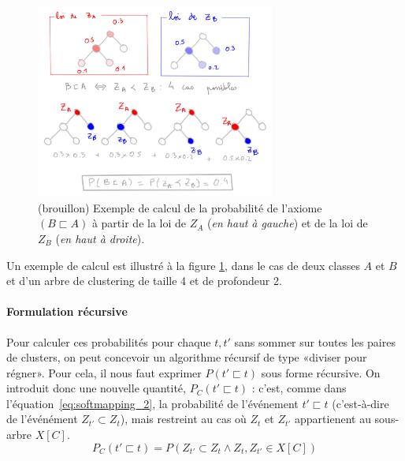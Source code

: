 \begin{figure}[h]
    \centering
    \includegraphics[width=0.7\textwidth]{img/softmapping.jpg}
    \caption[Principe de la méthode Soft Mapping]{(brouillon) Exemple de calcul de la probabilité de l'axiome $(B \sqsubset A)$ à partir de la loi de $Z_A$ (\textit{en haut à gauche}) et de la loi de $Z_B$ (\textit{en haut à droite}).}
    \label{fig:te-softmapping-example}
\end{figure}

Un exemple de calcul est illustré à la figure \ref{fig:te-softmapping-example}, dans le cas de deux classes $A$ et $B$ et d'un arbre de clustering de taille 4 et de profondeur 2.

\paragraph{Formulation récursive}

Pour calculer ces probabilités pour chaque $t, t'$ sans sommer sur toutes les paires de clusters, on peut concevoir un algorithme récursif de type «diviser pour régner». Pour cela, il nous faut exprimer $P(t' \sqsubset t)$ sous forme récursive. On introduit donc une nouvelle quantité,  $P_C(t' \sqsubset t)$ : c'est, comme dans l'équation~\ref{eq:softmapping_2}, la probabilité de l'événement $t' \sqsubset t$ (c'est-à-dire de l'événément $Z_{t'} \subset Z_{t}$), mais restreint au cas où $Z_t$ et $Z_{t'}$ appartienent au sous-arbre $X[C]$.
\begin{equation}
    P_C(t' \sqsubset t) = P(Z_{t'} \subset Z_{t} \land Z_t, Z_{t'} \in X[C])
\end{equation}

